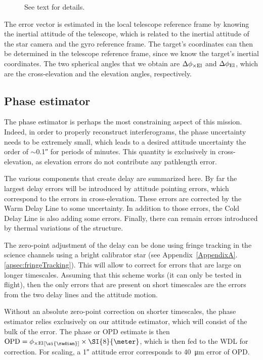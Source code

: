 \begin{figure}[!ht]
	\centering
	
	\caption[The star camera reference frame]{See text for details.}
	\label{fig:starcamRefFrame2}
  \end{figure}

The error vector is estimated in the local telescope reference frame by knowing the inertial attitude of the telescope, which is related to the inertial attitude of the star camera and the gyro reference frame. The target's coordinates can then be determined in the telescope reference frame, since we know the target's inertial coordinates. The two spherical angles that we obtain are $\Delta\phi_{\times\textrm{El}}$ and $\Delta\phi_\textrm{El}$, which are the cross-elevation and the elevation angles, respectively. 


\subsection{Phase estimator}

The phase estimator is perhaps the most constraining aspect of this mission. Indeed, in order to properly reconstruct interferograms, the phase uncertainty needs to be extremely small, which leads to a desired attitude uncertainty the order of $\sim$\ang{;;0.1} for periods of minutes. This quantity is exclusively in cross-elevation, as elevation errors do not contribute any pathlength error. 

The various components that create delay are summarized here. By far the largest delay errors will be introduced by attitude pointing errors, which correspond to the errors in cross-elevation. These errors are corrected by the Warm Delay Line to some uncertainty. In addition to those errors, the Cold Delay Line is also adding some errors. Finally, there can remain errors introduced by thermal variations of the structure.

The zero-point adjustment of the delay can be done using fringe tracking in the science channels using a bright calibrator star (see Appendix~\ref{AppendixA}.\ref{apsec:fringeTracking}). This will allow to correct for errors that are large on longer timescales. Assuming that this scheme works (it can only be tested in flight), then the only errors that are present on short timescales are the errors from the two delay lines and the attitude motion. 

Without an absolute zero-point correction on shorter timescales, the phase estimator relies exclusively on our attitude estimator, which will consist of the bulk of the error. The phase or OPD estimate is then $\OPD = \crossEl\units{\si{\radian}}\times \SI{8}{\meter} $, which is then fed to the WDL for correction. For scaling, a \ang{;;1} attitude error corresponds to \SI{40}{\um} error of OPD. 

